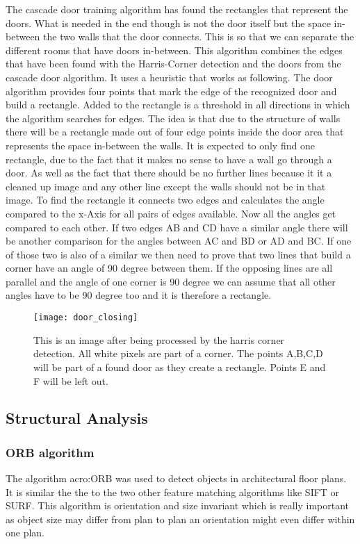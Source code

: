 The cascade door training algorithm has found the rectangles that represent the doors. What is needed in the end though is not the door itself but the space in-between the two walls that the door connects. This is so that we can separate the different rooms that have doors in-between.
This algorithm combines the edges that have been found with the Harris-Corner detection and the doors from the cascade door algorithm. It uses a heuristic that works as following. The door algorithm provides four points that mark the edge of the recognized door and build a rectangle.
Added to the rectangle is  a threshold in all directions in which the algorithm searches for edges. The idea is that due to the structure of walls there will be a rectangle made out of four edge points inside the door area that represents the space in-between the walls. It is expected to only find one rectangle, due to the fact that it makes no sense to have a wall go through a door. As well as the fact that there should be no further lines because it it a cleaned up image and any other line except the walls should not be in that image.
To find the rectangle it connects two edges and calculates the angle compared to the x-Axis for all pairs of edges available. Now all the angles get compared to each other. If two edges AB and CD have a similar angle there will be another comparison for the angles between AC and BD or AD and BC. If one of those two is also of a similar we then need to prove that two lines that build a corner have an angle of 90 degree between them. If the opposing lines are all parallel and the angle of one corner is 90 degree we can assume that all other angles have to be 90 degree too and it is therefore a rectangle. 

\begin{figure}[h]
	\centering
	\texttt{[image: door\_closing]}
	\caption{This is an image after being processed by the harris corner detection. All white pixels are part of a corner. The points A,B,C,D will be part of a found door as they create a rectangle. Points E and F will be left out.}
	\label{fig:door_closing}
\end{figure}


\subsection{Structural Analysis}

\subsubsection{ORB algorithm}
The algorithm \acrfull{acro:ORB} was used to detect objects in architectural floor plans. It is similar the the to the two other feature matching algorithms like SIFT or SURF. This algorithm is orientation and size invariant which is really important as object size may differ from plan to plan an orientation might even differ within one plan.

